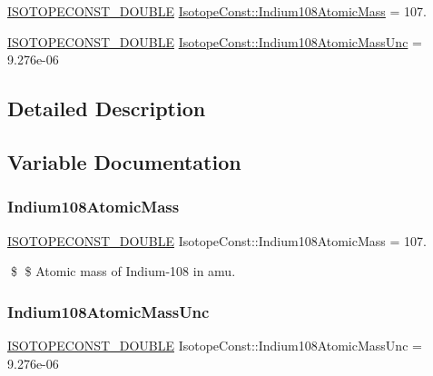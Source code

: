 \begin{DoxyCompactItemize}
\item 
\mbox{\hyperlink{group___isotope_const-_macros_ga8f45a7272ce02c0b4c65c44636ed719a}{I\+S\+O\+T\+O\+P\+E\+C\+O\+N\+S\+T\+\_\+\+D\+O\+U\+B\+LE}} \mbox{\hyperlink{group___isotope_const-_indium-_in108_gaad47a96a9cdc5a81b753e0d315312475}{Isotope\+Const\+::\+Indium108\+Atomic\+Mass}} = 107.
\item 
\mbox{\hyperlink{group___isotope_const-_macros_ga8f45a7272ce02c0b4c65c44636ed719a}{I\+S\+O\+T\+O\+P\+E\+C\+O\+N\+S\+T\+\_\+\+D\+O\+U\+B\+LE}} \mbox{\hyperlink{group___isotope_const-_indium-_in108_gacef5b6e40ea0afc343f84d0c0799e7f2}{Isotope\+Const\+::\+Indium108\+Atomic\+Mass\+Unc}} = 9.\+276e-\/06
\end{DoxyCompactItemize}


\subsection{Detailed Description}


\subsection{Variable Documentation}
\mbox{\label{group___isotope_const-_indium-_in108_gaad47a96a9cdc5a81b753e0d315312475}} 
\subsubsection{\texorpdfstring{Indium108\+Atomic\+Mass}{Indium108AtomicMass}}
{\footnotesize\ttfamily \mbox{\hyperlink{group___isotope_const-_macros_ga8f45a7272ce02c0b4c65c44636ed719a}{I\+S\+O\+T\+O\+P\+E\+C\+O\+N\+S\+T\+\_\+\+D\+O\+U\+B\+LE}} Isotope\+Const\+::\+Indium108\+Atomic\+Mass = 107.}

\$ \$ Atomic mass of Indium-\/108 in amu. \mbox{\label{group___isotope_const-_indium-_in108_gacef5b6e40ea0afc343f84d0c0799e7f2}} 
\subsubsection{\texorpdfstring{Indium108\+Atomic\+Mass\+Unc}{Indium108AtomicMassUnc}}
{\footnotesize\ttfamily \mbox{\hyperlink{group___isotope_const-_macros_ga8f45a7272ce02c0b4c65c44636ed719a}{I\+S\+O\+T\+O\+P\+E\+C\+O\+N\+S\+T\+\_\+\+D\+O\+U\+B\+LE}} Isotope\+Const\+::\+Indium108\+Atomic\+Mass\+Unc = 9.\+276e-\/06}

